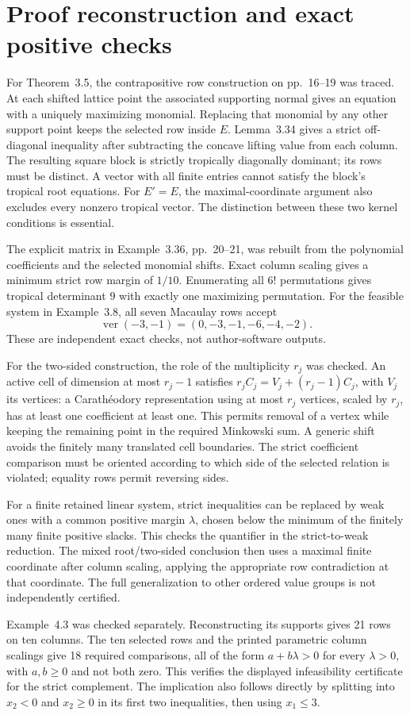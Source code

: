 \documentclass[10pt]{article}
\begin{document}
\section*{Proof reconstruction and exact positive checks}
For Theorem 3.5, the contrapositive row construction on pp. 16–19 was traced. At each shifted lattice point the associated supporting normal gives an equation with a uniquely maximizing monomial. Replacing that monomial by any other support point keeps the selected row inside \(E\). Lemma 3.34 gives a strict off-diagonal inequality after subtracting the concave lifting value from each column. The resulting square block is strictly tropically diagonally dominant; its rows must be distinct. A vector with all finite entries cannot satisfy the block’s tropical root equations. For \(E'=E\), the maximal-coordinate argument also excludes every nonzero tropical vector. The distinction between these two kernel conditions is essential.\par
The explicit matrix in Example 3.36, pp. 20–21, was rebuilt from the polynomial coefficients and the selected monomial shifts. Exact column scaling gives a minimum strict row margin of \(1/10\). Enumerating all \(6!\) permutations gives tropical determinant \(9\) with exactly one maximizing permutation. For the feasible system in Example 3.8, all seven Macaulay rows accept \[\operatorname{ver}(-3,-1)=(0,-3,-1,-6,-4,-2).\] These are independent exact checks, not author-software outputs.\par
For the two-sided construction, the role of the multiplicity \(r_j\) was checked. An active cell of dimension at most \(r_j-1\) satisfies \(r_j C_j=V_j+(r_j-1)C_j\), with \(V_j\) its vertices: a Carathéodory representation using at most \(r_j\) vertices, scaled by \(r_j\), has at least one coefficient at least one. This permits removal of a vertex while keeping the remaining point in the required Minkowski sum. A generic shift avoids the finitely many translated cell boundaries. The strict coefficient comparison must be oriented according to which side of the selected relation is violated; equality rows permit reversing sides.\par
For a finite retained linear system, strict inequalities can be replaced by weak ones with a common positive margin \(\lambda\), chosen below the minimum of the finitely many finite positive slacks. This checks the quantifier in the strict-to-weak reduction. The mixed root/two-sided conclusion then uses a maximal finite coordinate after column scaling, applying the appropriate row contradiction at that coordinate. The full generalization to other ordered value groups is not independently certified.\par
Example 4.3 was checked separately. Reconstructing its supports gives 21 rows on ten columns. The ten selected rows and the printed parametric column scalings give 18 required comparisons, all of the form \(a+b\lambda>0\) for every \(\lambda>0\), with \(a,b\ge0\) and not both zero. This verifies the displayed infeasibility certificate for the strict complement. The implication also follows directly by splitting into \(x_2<0\) and \(x_2\ge0\) in its first two inequalities, then using \(x_1\le3\).\par
\end{document}
